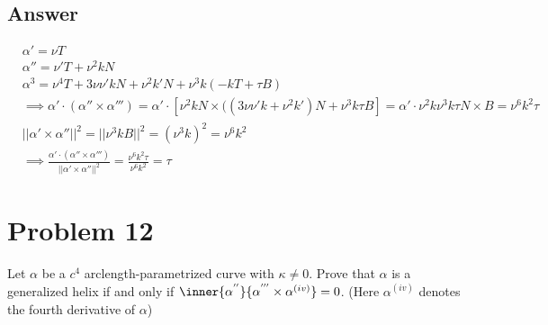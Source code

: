 \documentclass[
	12pt, %
]{fphw}
\theoremstyle{plain}
\begin{document}
\subsection*{Answer}
\begin{align*}
&\alpha'=\nu T \\
&\alpha''=\nu'T+\nu^2 kN\\
&\alpha^3 = \nu^4T+3\nu\nu'kN+\nu^2k'N+\nu^3k(-kT+\tau B)\\
&\implies\alpha'\cdot (\alpha''\times\alpha''')=\alpha'\cdot[\nu^2kN\times((3\nu\nu'k+\nu^2k')N+\nu^3k\tau B]=\alpha'\cdot\nu^2k\nu^3k\tau N\times B = \nu^6k^2\tau\\
&||\alpha'\times\alpha''||^2 = ||\nu^3kB||^2=(\nu^3k)^2=\nu^6k^2\\
&\implies\frac{\alpha'\cdot(\alpha''\times\alpha''')}{||\alpha'\times\alpha''||^2}=\frac{\nu^6k^2\tau}{\nu^6k^2}=\tau
\end{align*}

\section*{Problem 12}
\begin{problem}
     Let $\alpha$ be a $c^4$ arclength-parametrized curve with $\kappa \neq 0$. Prove that $\alpha$ is a generalized helix if and only
if $\inner{\alpha^{''}}{\alpha^{'''} \times \alpha^{(iv)}}= 0$. (Here $\alpha^{(iv)}$ denotes the fourth derivative of $\alpha$)
\end{problem}
\end{document}

